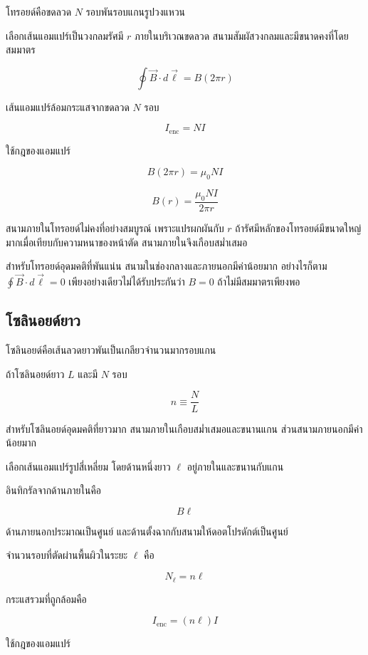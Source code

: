 โทรอยด์คือขดลวด $N$ รอบพันรอบแกนรูปวงแหวน

เลือกเส้นแอมแปร์เป็นวงกลมรัศมี $r$ ภายในบริเวณขดลวด สนามสัมผัสวงกลมและมีขนาดคงที่โดยสมมาตร

\[
\oint\vec{B}\cdot d\vec{\ell}
=B(2\pi r)
\]

เส้นแอมแปร์ล้อมกระแสจากขดลวด $N$ รอบ

\[
I_{\text{enc}}=NI
\]

ใช้กฎของแอมแปร์

\[
B(2\pi r)=\mu_0NI
\]

\begin{tcolorbox}[title={สนามภายในโทรอยด์อุดมคติ}]
\[
\boxed{
B(r)=\frac{\mu_0NI}{2\pi r}}
\]
\end{tcolorbox}

สนามภายในโทรอยด์ไม่คงที่อย่างสมบูรณ์ เพราะแปรผกผันกับ $r$ ถ้ารัศมีหลักของโทรอยด์มีขนาดใหญ่มากเมื่อเทียบกับความหนาของหน้าตัด สนามภายในจึงเกือบสม่ำเสมอ

สำหรับโทรอยด์อุดมคติที่พันแน่น สนามในช่องกลางและภายนอกมีค่าน้อยมาก อย่างไรก็ตาม $\oint\vec{B}\cdot d\vec{\ell}=0$ เพียงอย่างเดียวไม่ได้รับประกันว่า $B=0$ ถ้าไม่มีสมมาตรเพียงพอ

\subsection{โซลินอยด์ยาว}

โซลินอยด์คือเส้นลวดยาวพันเป็นเกลียวจำนวนมากรอบแกน

\begin{tcolorbox}[title={นิยาม: จำนวนรอบต่อหนึ่งหน่วยความยาว}]
ถ้าโซลินอยด์ยาว $L$ และมี $N$ รอบ

\[
\boxed{n\equiv\frac{N}{L}}
\]
\end{tcolorbox}

สำหรับโซลินอยด์อุดมคติที่ยาวมาก สนามภายในเกือบสม่ำเสมอและขนานแกน ส่วนสนามภายนอกมีค่าน้อยมาก

เลือกเส้นแอมแปร์รูปสี่เหลี่ยม โดยด้านหนึ่งยาว $\ell$ อยู่ภายในและขนานกับแกน

อินทิกรัลจากด้านภายในคือ

\[
B\ell
\]

ด้านภายนอกประมาณเป็นศูนย์ และด้านตั้งฉากกับสนามให้ดอตโปรดักต์เป็นศูนย์

จำนวนรอบที่ตัดผ่านพื้นผิวในระยะ $\ell$ คือ

\[
N_{\ell}=n\ell
\]

กระแสรวมที่ถูกล้อมคือ

\[
I_{\text{enc}}=(n\ell)I
\]

ใช้กฎของแอมแปร์

